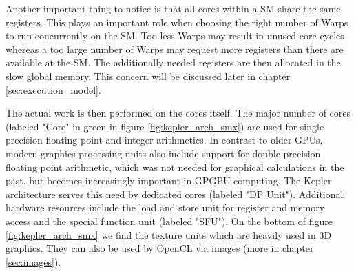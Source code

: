 
Another important thing to notice is that all cores within a SM share the same registers. This plays an important role when choosing the right number of Warps to run concurrently on the SM. Too less Warps may result in unused core cycles whereas a too large number of Warps may request more registers than there are available at the SM. The additionally needed registers are then allocated in the slow global memory. This concern will be discussed later in chapter \ref{sec:execution_model}.

The actual work is then performed on the cores itself. The major number of cores (labeled "Core" in green in figure \ref{fig:kepler_arch_smx}) are used for single precision floating point and integer arithmetics. In contrast to older GPUs, modern graphics processing units also include support for double precision floating point arithmetic, which was not needed for graphical calculations in the past, but becomes increasingly important in GPGPU computing. The Kepler architecture serves this need by dedicated cores (labeled "DP Unit"). Additional hardware resources include the load and store unit for register and memory access and the special function unit (labeled "SFU"). On the bottom of figure \ref{fig:kepler_arch_smx} we find the texture units which are heavily used in 3D graphics. They can also be used by OpenCL via images (more in chapter \ref{sec:images}).


